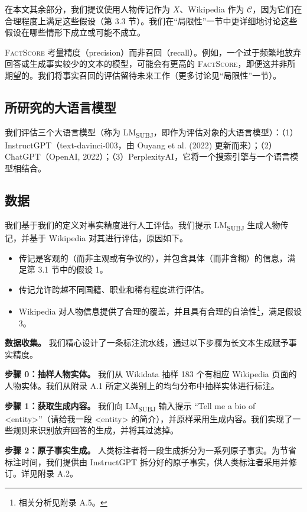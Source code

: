 \documentclass[11pt,UTF8,fontset=fandol]{ctexart}
\newcommand{\FS}{\textsc{FactScore}}
\newcommand{\subj}{LM\textsubscript{SUBJ}}
\begin{document}
在本文其余部分，我们提议使用人物传记作为 $X$、Wikipedia 作为 $\mathcal{C}$，因为它们在合理程度上满足这些假设（第 3.3 节）。我们在“局限性”一节中更详细地讨论这些假设在哪些情形下成立或可能不成立。

\FS{} 考量精度（precision）而非召回（recall）。例如，一个过于频繁地放弃回答或生成事实较少的文本的模型，可能会有更高的 \FS，即便这并非所期望的。我们将事实召回的评估留待未来工作（更多讨论见“局限性”一节）。

\subsection{所研究的大语言模型}

我们评估三个大语言模型（称为 \subj，即作为评估对象的大语言模型）：（1）InstructGPT（text-davinci-003，由 Ouyang et al. (2022) 更新而来）；（2）ChatGPT（OpenAI, 2022）；（3）PerplexityAI，它将一个搜索引擎与一个语言模型相结合。

\subsection{数据}

我们基于我们的定义对事实精度进行人工评估。我们提示 \subj{} 生成人物传记，并基于 Wikipedia 对其进行评估，原因如下。

\begin{itemize}[leftmargin=2em]
\item 传记是客观的（而非主观或有争议的），并包含具体（而非含糊）的信息，满足第 3.1 节中的假设 1。
\item 传记允许跨越不同国籍、职业和稀有程度进行评估。
\item Wikipedia 对人物信息提供了合理的覆盖，并且具有合理的自洽性\footnote{相关分析见附录 A.5。}，满足假设 3。
\end{itemize}

\textbf{数据收集。} 我们精心设计了一条标注流水线，通过以下步骤为长文本生成赋予事实精度。

\textbf{步骤 0：抽样人物实体。} 我们从 Wikidata 抽样 183 个有相应 Wikipedia 页面的人物实体。我们从附录 A.1 所定义类别上的均匀分布中抽样实体进行标注。

\textbf{步骤 1：获取生成内容。} 我们向 \subj{} 输入提示 “Tell me a bio of <entity>”（请给我一段 <entity> 的简介），并原样采用生成内容。我们实现了一些规则来识别放弃回答的生成，并将其过滤掉。

\textbf{步骤 2：原子事实生成。} 人类标注者将一段生成拆分为一系列原子事实。为节省标注时间，我们提供由 InstructGPT 拆分好的原子事实，供人类标注者采用并修订。详见附录 A.2。
\end{document}
